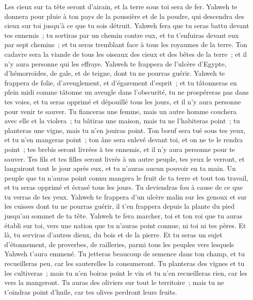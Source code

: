 \begin{multicols}{2}
Les cieux sur ta tête seront d'airain, et la terre sous toi sera de fer.
Yahweh te donnera pour pluie à ton pays de la poussière et de la poudre, qui descendra des cieux sur toi jusqu'à ce que tu sois détruit.
Yahweh fera que tu seras battu devant tes ennemis~; tu sortiras par un chemin contre eux, et tu t'enfuiras devant eux par sept chemins~; et tu seras tremblant face à tous les royaumes de la terre.
Ton cadavre sera la viande de tous les oiseaux des cieux et des bêtes de la terre~; et il n'y aura personne qui les effraye.
Yahweh te frappera de l'ulcère d'Egypte, d'hémorroïdes, de gale, et de teigne, dont tu ne pourras guérir.
Yahweh te frappera de folie, d'aveuglement, et d'égarement d'esprit~;
et tu tâtonneras en plein midi comme tâtonne un aveugle dans l'obscurité, tu ne prospéreras pas dans tes voies, et tu seras opprimé et dépouillé tous les jours, et il n'y aura personne pour venir te sauver.
Tu fianceras une femme, mais un autre homme couchera avec elle et la violera~; tu bâtiras une maison, mais tu ne l'habiteras point~; tu planteras une vigne, mais tu n'en jouiras point.
Ton bœuf sera tué sous tes yeux, et tu n'en mangeras point~; ton âne sera enlevé devant toi, et on ne te le rendra point~; tes brebis seront livrées à tes ennemis, et il n'y aura personne pour te sauver.
Tes fils et tes filles seront livrés à un autre peuple, tes yeux le verront, et languiront tout le jour après eux, et tu n'auras aucun pouvoir en ta main.
Un peuple que tu n'auras point connu mangera le fruit de ta terre et tout ton travail, et tu seras opprimé et écrasé tous les jours.
Tu deviendras fou à cause de ce que tu verras de tes yeux.
Yahweh te frappera d'un ulcère malin sur les genoux et sur les cuisses dont tu ne pourras guérir, il t'en frappera depuis la plante du pied jusqu'au sommet de ta tête.
Yahweh te fera marcher, toi et ton roi que tu auras établi sur toi, vers une nation que tu n'auras point connue, ni toi ni tes pères. Et là, tu serviras d'autres dieux, du bois et de la pierre.
Et tu seras un sujet d'étonnement, de proverbes, de railleries, parmi tous les peuples vers lesquels Yahweh t'aura emmené.
Tu jetteras beaucoup de semence dans ton champ, et tu recueilleras peu, car les sauterelles la consumeront.
Tu planteras des vignes et tu les cultiveras~; mais tu n'en boiras point le vin et tu n'en recueilleras rien, car les vers la mangeront.
Tu auras des oliviers sur tout le territoire~; mais tu ne t'oindras point d'huile, car tes olives perdront leurs fruits.

\end{multicols}
